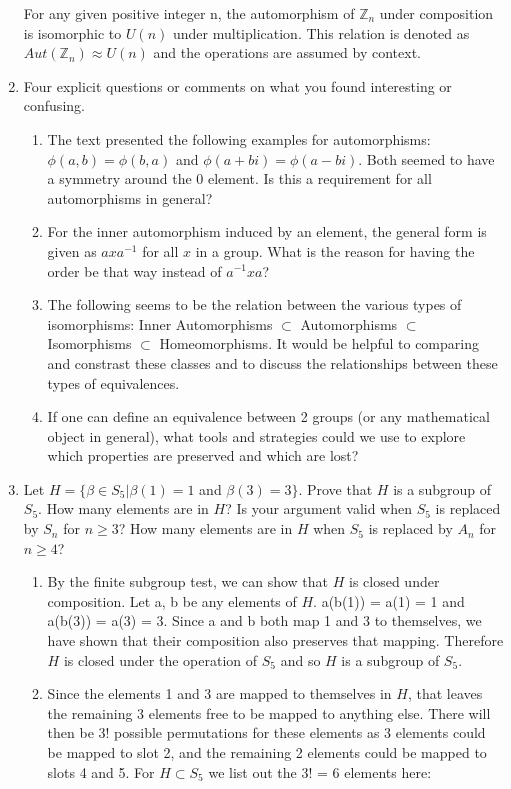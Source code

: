 \documentclass{article}
\newcommand{\Z}{\mathbb Z}
\begin{document}
\begin{enumerate}
\begin{flushleft}
    For any given positive integer n, the automorphism of $\Z_n$ under composition is isomorphic to $U(n)$ under multiplication. This relation is denoted as $Aut(\Z_n) \approx U(n)$ and the operations are assumed by context.
    \end{flushleft}
    \item Four explicit questions or comments on what you found interesting or confusing.
    \begin{enumerate}
        \item The text presented the following examples for automorphisms: $\phi(a,b) = \phi(b,a)$ and $\phi(a+bi) = \phi(a-bi)$. Both seemed to have a symmetry around the 0 element. Is this a requirement for all automorphisms in general?
        \item For the inner automorphism induced by an element, the general form is given as $axa^{-1}$ for all $x$ in a group. What is the reason for having the order be that way instead of $a^{-1}xa$?
        \item The following seems to be the relation between the various types of isomorphisms: Inner Automorphisms $\subset$ Automorphisms $\subset$ Isomorphisms $\subset$ Homeomorphisms. It would be helpful to comparing and constrast these classes and to discuss the relationships between these types of equivalences.
        \item If one can define an equivalence between 2 groups (or any mathematical object in general), what tools and strategies could we use to explore which properties are preserved and which are lost?
    \end{enumerate}
    \newpage
    \item Let $H = \{ \beta \in S _ { 5 } | \beta ( 1 ) = 1$ and $\beta ( 3 ) = 3 \}$. Prove that $H$ is a subgroup of $S_5$. How many elements are in $H$? Is your argument valid when $S_5$ is replaced by $S_n$ for $n \geq 3$? How many elements are in $H$ when $S_5$ is replaced by $A_n$ for $n \geq 4$?
    \begin{enumerate}
        \item By the finite subgroup test, we can show that $H$ is closed under composition. Let a, b be any elements of $H$. a(b(1)) = a(1) = 1 and a(b(3)) = a(3) = 3. Since a and b both map 1 and 3 to themselves, we have shown that their composition also preserves that mapping. Therefore $H$ is closed under the operation of $S_5$ and so $H$ is a subgroup of $S_5$.
        \item Since the elements 1 and 3 are mapped to themselves in $H$, that leaves the remaining 3 elements free to be mapped to anything else. There will then be 3! possible permutations for these elements as 3 elements could be mapped to slot 2, and the remaining 2 elements could be mapped to slots 4 and 5. For $H \subset S_5$ we list out the 3! = 6 elements here:

\end{enumerate}
\end{enumerate}
\end{document}
